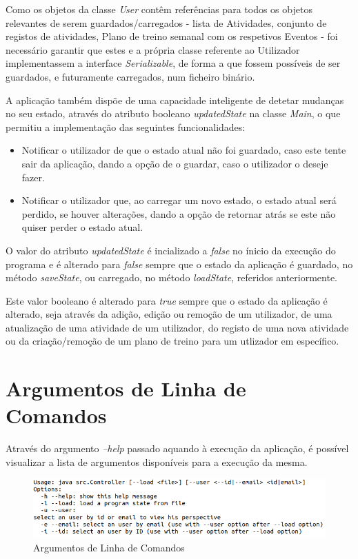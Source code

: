 \documentclass[a4paper,12pt]{scrreprt}
\begin{document}
Como os objetos da classe \textit{User} contêm referências para todos os objetos relevantes de serem guardados/carregados - lista de Atividades, conjunto de registos de atividades, Plano de treino semanal com os respetivos Eventos - foi necessário garantir que estes e a própria classe referente ao Utilizador implementassem a interface \textit{Serializable}, de forma a que fossem possíveis de ser guardados, e futuramente carregados, num ficheiro binário.

A aplicação também dispõe de uma capacidade inteligente de detetar mudanças no seu estado, através do atributo booleano \textit{updatedState} na classe \textit{Main}, o que permitiu a implementação das seguintes funcionalidades:

\begin{itemize}
    \item Notificar o utilizador de que o estado atual não foi guardado, caso este tente sair da aplicação, dando a opção de o guardar, caso o utilizador o deseje fazer.
    \item Notificar o utilizador que, ao carregar um novo estado, o estado atual será perdido, se houver alterações, dando a opção de retornar atrás se este não quiser perder o estado atual.
\end{itemize}

O valor do atributo \textit{updatedState} é incializado a \textit{false} no ínicio da execução do programa e é alterado para \textit{false} sempre que o estado da aplicação é guardado, no método \textit{saveState}, ou carregado, no método \textit{loadState}, referidos anteriormente.

Este valor booleano é alterado para \textit{true} sempre que o estado da aplicação é alterado, seja através da adição, edição ou remoção de um utilizador, de uma atualização de uma atividade de um utilizador, do registo de uma nova atividade ou da criação/remoção de um plano de treino para um utlizador em específico.

\clearpage
\section{Argumentos de Linha de Comandos}
    Através do argumento \textit{--help} passado aquando à execução da aplicação, é possível visualizar a lista de argumentos disponíveis para a execução da mesma.

    \begin{figure}[!ht]
        \centering
        \includegraphics[width=\textwidth]{images/help_option.png}
        \caption{Argumentos de Linha de Comandos}
        \label{fig:opcao-help}
    \end{figure}
\end{document}
